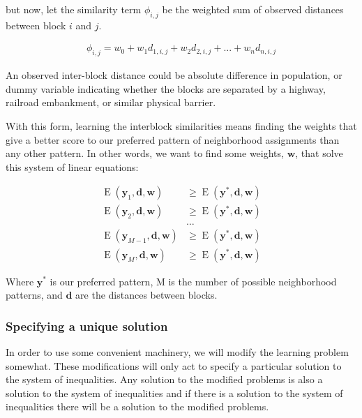 \noindent
but now, let the similarity term $\phi_{i,j}$ be the weighted sum of
observed distances between block $i$ and $j$. 

\begin{align}
\phi_{i,j} = w_0 + w_1d_{1,i,j} + w_2d_{2,i,j} + ... + w_nd_{n,i,j}
\end{align} 

\noindent
An observed inter-block distance could be absolute difference in
population, or dummy variable indicating whether the blocks are
separated by a highway, railroad embankment, or similar physical
barrier.

\noindent

With this form, learning the interblock similarities means finding the
weights that give a better score to our preferred pattern of
neighborhood assignments than any other pattern. In other words, we
want to find some weights, $\mathbf{w}$, that solve this system of
linear equations:

\begin{align*}
\operatorname{E}(\mathbf{y}_1, \mathbf{d}, \mathbf{w})
&\geq \operatorname{E}(\mathbf{y}^*, \mathbf{d}, \mathbf{w}) \\
\operatorname{E}(\mathbf{y}_2, \mathbf{d}, \mathbf{w})
&\geq \operatorname{E}(\mathbf{y}^*, \mathbf{d}, \mathbf{w}) \\
&\ldots \\
\operatorname{E}(\mathbf{y}_{M-1}, \mathbf{d}, \mathbf{w})
&\geq \operatorname{E}(\mathbf{y}^*, \mathbf{d}, \mathbf{w}) \\
\operatorname{E}(\mathbf{y}_{M}, \mathbf{d}, \mathbf{w})
&\geq \operatorname{E}(\mathbf{y}^*, \mathbf{d}, \mathbf{w})
\end{align*}

Where $\mathbf{y}^*$ is our preferred pattern, M is the number of
possible neighborhood patterns, and $\mathbf{d}$ are the distances
between blocks.

\subsubsection{Specifying a unique solution}
In order to use some convenient machinery, we will modify the learning
problem somewhat. These modifications will only act to specify a
particular solution to the system of inequalities. Any solution to the
modified problems is also a solution to the system of inequalities and
if there is a solution to the system of inequalities there will be a
solution to the modified problems.

